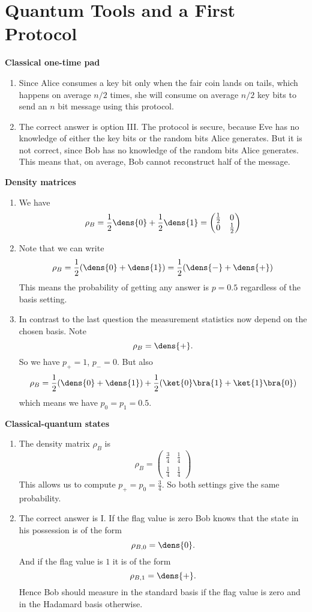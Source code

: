 
\chapter{Quantum Tools and a First Protocol}

\begin{exercises}


\item {\bf Classical one-time pad}
\begin{enumerate}
\item Since Alice consumes a key bit only when the fair coin lands on tails, which happens on average \(n/2\) times, she will consume on average \(n/2\) key bits to send an \(n\) bit message using this protocol.
\item The correct answer is option III. The protocol is secure, because Eve has no knowledge of either the key bits or the random bits Alice generates. But it is not correct, since Bob has no knowledge of the random bits Alice generates. This means that, on average, Bob cannot reconstruct half of the message.
\end{enumerate}


\item {\bf Density matrices}
\begin{enumerate}
\item We have
	\[ \rho_B = \frac{1}{2}\dens{0} + \frac{1}{2}\dens{1} = \begin{pmatrix} \frac{1}{2} & 0 \\ 0 & \frac{1}{2}\end{pmatrix}\]
\item Note that we can write
	\[\rho_B = \frac{1}{2}(\dens{0}+\dens{1}) = \frac{1}{2}(\dens{-} + \dens{+})\]
	This means the probability of getting any answer is \(p=0.5\) regardless of the basis setting.
\item In contrast to the last question the measurement statistics now depend on the chosen basis. Note
	\[\rho_B = \dens{+}.\]
	So we have \(p_+=1\), \( p_- = 0\). But also
	\[\rho_B = \frac{1}{2}(\dens{0}+\dens{1}) + \frac{1}{2}(\ket{0}\bra{1} + \ket{1}\bra{0})\]
	which means we have \(p_0 = p_1 = 0.5\).
\end{enumerate}


\item {\bf Classical-quantum states}
\begin{enumerate}
\item The density matrix \(\rho_B\) is \[\rho_B = \begin{pmatrix} \frac{3}{4} & \frac{1}{4}\\ \frac{1}{4} & \frac{1}{4}\end{pmatrix}\] This allows us to compute \(p_+ = p_0 = \frac{3}{4}\). So both settings give the same probability.
\item The correct answer is I. If the flag value is zero Bob knows that the state in his possession is of the form \[\rho_{B,0} = \dens{0}.\] And if the flag value is \(1\) it is of the form \[\rho_{B,1} = \dens{+}.\] Hence Bob should measure in the standard basis if the flag value is zero and in the Hadamard basis otherwise.
\end{enumerate}



\end{exercises}
